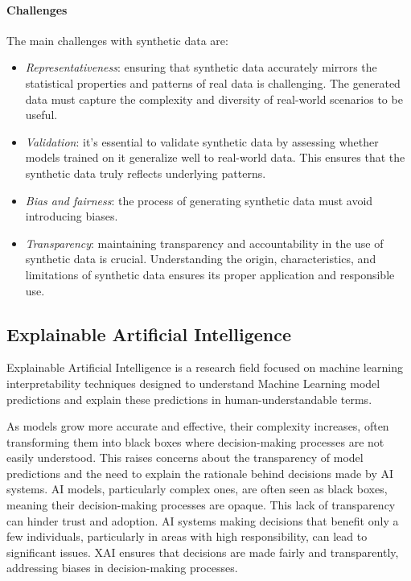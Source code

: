 \paragraph*{Challenges}
The main challenges with synthetic data are: 
\begin{itemize}
    \item \textit{Representativeness}: ensuring that synthetic data accurately mirrors the statistical properties and patterns of real data is challenging. 
        The generated data must capture the complexity and diversity of real-world scenarios to be useful.
    \item \textit{Validation}: it's essential to validate synthetic data by assessing whether models trained on it generalize well to real-world data. 
        This ensures that the synthetic data truly reflects underlying patterns.
    \item \textit{Bias and fairness}: the process of generating synthetic data must avoid introducing biases.
    \item \textit{Transparency}: maintaining transparency and accountability in the use of synthetic data is crucial. 
        Understanding the origin, characteristics, and limitations of synthetic data ensures its proper application and responsible use.
\end{itemize}

\subsection{Explainable Artificial Intelligence}
Explainable Artificial Intelligence is a research field focused on machine learning interpretability techniques designed to understand Machine Learning model predictions and explain these predictions in human-understandable terms. 

As models grow more accurate and effective, their complexity increases, often transforming them into black boxes where decision-making processes are not easily understood.
This raises concerns about the transparency of model predictions and the need to explain the rationale behind decisions made by AI systems.
AI models, particularly complex ones, are often seen as black boxes, meaning their decision-making processes are opaque. This lack of transparency can hinder trust and adoption.
AI systems making decisions that benefit only a few individuals, particularly in areas with high responsibility, can lead to significant issues.
XAI ensures that decisions are made fairly and transparently, addressing biases in decision-making processes.

